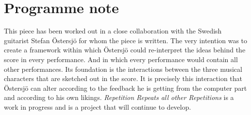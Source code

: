 
\section{Programme note}
\label{sec:repet-programme-note}


This piece has been worked out in a close collaboration with the Swedish guitarist Stefan \"{O}stersj\"{o} for whom the piece is written. The very intention was to create a framework within which \"{O}stersj\"{o} could re-interpret the ideas behind the score in every performance. And in which every performance would contain all other performances. Its foundation is the interactions between the three musical characters that are sketched out in the score. It is precisely this interaction that \"{O}stersj\"{o} can alter according to the feedback he is getting from the computer part and according to his own likings. \emph{Repetition Repeats all other Repetitions} is a work in progress and is a project that will continue to develop.

